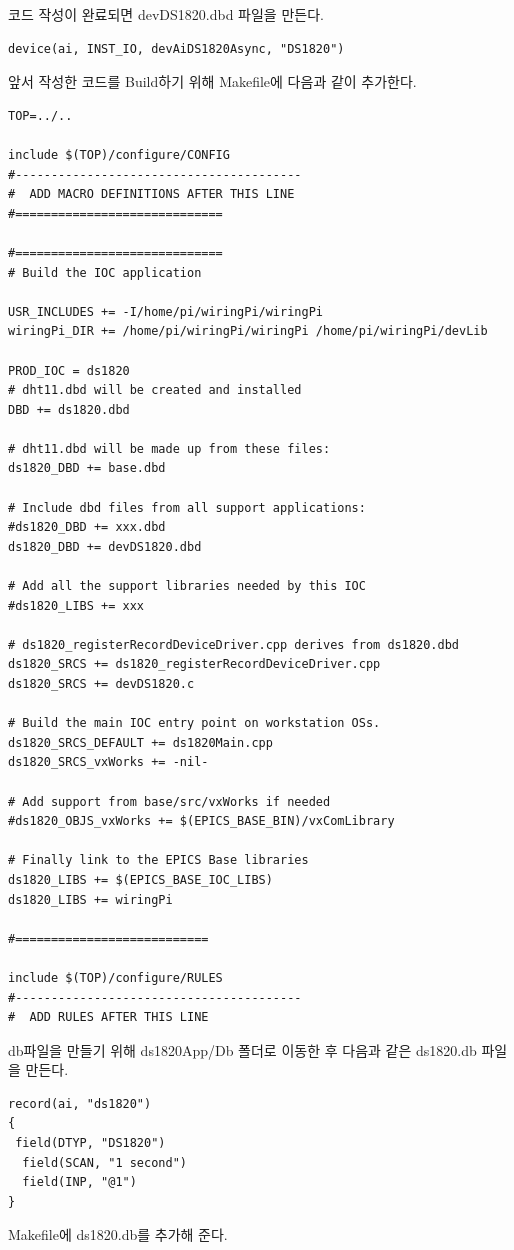 \documentclass[11pt
  , a4paper
  , article
  , oneside
]{memoir}
\begin{document}
코드 작성이 완료되면 devDS1820.dbd 파일을 만든다.
\begin{lstlisting}[style=termstyle]
device(ai, INST_IO, devAiDS1820Async, "DS1820")
\end{lstlisting}
앞서 작성한 코드를 Build하기 위해 Makefile에 다음과 같이 추가한다.
\begin{lstlisting}[style=termstyle]
TOP=../..

include $(TOP)/configure/CONFIG
#----------------------------------------
#  ADD MACRO DEFINITIONS AFTER THIS LINE
#=============================

#=============================
# Build the IOC application

USR_INCLUDES += -I/home/pi/wiringPi/wiringPi
wiringPi_DIR += /home/pi/wiringPi/wiringPi /home/pi/wiringPi/devLib

PROD_IOC = ds1820
# dht11.dbd will be created and installed
DBD += ds1820.dbd

# dht11.dbd will be made up from these files:
ds1820_DBD += base.dbd

# Include dbd files from all support applications:
#ds1820_DBD += xxx.dbd
ds1820_DBD += devDS1820.dbd

# Add all the support libraries needed by this IOC
#ds1820_LIBS += xxx

# ds1820_registerRecordDeviceDriver.cpp derives from ds1820.dbd
ds1820_SRCS += ds1820_registerRecordDeviceDriver.cpp
ds1820_SRCS += devDS1820.c

# Build the main IOC entry point on workstation OSs.
ds1820_SRCS_DEFAULT += ds1820Main.cpp
ds1820_SRCS_vxWorks += -nil-

# Add support from base/src/vxWorks if needed
#ds1820_OBJS_vxWorks += $(EPICS_BASE_BIN)/vxComLibrary

# Finally link to the EPICS Base libraries
ds1820_LIBS += $(EPICS_BASE_IOC_LIBS)
ds1820_LIBS += wiringPi

#===========================

include $(TOP)/configure/RULES
#----------------------------------------
#  ADD RULES AFTER THIS LINE
\end{lstlisting}
db파일을 만들기 위해 ds1820App/Db 폴더로 이동한 후 다음과 같은 ds1820.db 파일을 만든다.
\begin{lstlisting}[style=termstyle]
record(ai, "ds1820")
{
 field(DTYP, "DS1820")
  field(SCAN, "1 second")
  field(INP, "@1")
}
\end{lstlisting}
Makefile에 ds1820.db를 추가해 준다.
\end{document}
